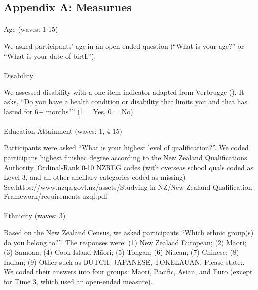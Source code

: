 \documentclass[
  single column]{article}
\makeatletter
\let\oldparagraph\paragraph
\renewcommand{\paragraph}{
    \@ifstar
      \xxxParagraphStar
      \xxxParagraphNoStar
  }
\newcommand{\xxxParagraphStar}[1]{\oldparagraph*{#1}\mbox{}}
\newcommand{\xxxParagraphNoStar}[1]{\oldparagraph{#1}\mbox{}}
\makeatother
\begin{document}
\newpage{}

\subsection{Appendix A: Measurues}\label{appendix-measures}

\paragraph{Age (waves: 1-15)}\label{age-waves-1-15}

We asked participants' age in an open-ended question (``What is your
age?'' or ``What is your date of birth'').

\paragraph{Disability}\label{disability}

We assessed disability with a one-item indicator adapted from Verbrugge
(). It asks, ``Do you have a health
condition or disability that limits you and that has lasted for 6+
months?'' (1 = Yes, 0 = No).

\paragraph{Education Attainment (waves: 1,
4-15)}\label{education-attainment-waves-1-4-15}

Participants were asked ``What is your highest level of
qualification?''. We coded participans highest finished degree according
to the New Zealand Qualifications Authority. Ordinal-Rank 0-10 NZREG
codes (with overseas school quals coded as Level 3, and all other
ancillary categories coded as missing)
See:https://www.nzqa.govt.nz/assets/Studying-in-NZ/New-Zealand-Qualification-Framework/requirements-nzqf.pdf

\paragraph{Ethnicity (waves: 3)}\label{ethnicity-waves-3}

Based on the New Zealand Census, we asked participants ``Which ethnic
group(s) do you belong to?''. The responses were: (1) New Zealand
European; (2) Māori; (3) Samoan; (4) Cook Island Māori; (5) Tongan; (6)
Niuean; (7) Chinese; (8) Indian; (9) Other such as DUTCH, JAPANESE,
TOKELAUAN. Please state:. We coded their answers into four groups:
Maori, Pacific, Asian, and Euro (except for Time 3, which used an
open-ended measure).
\end{document}
